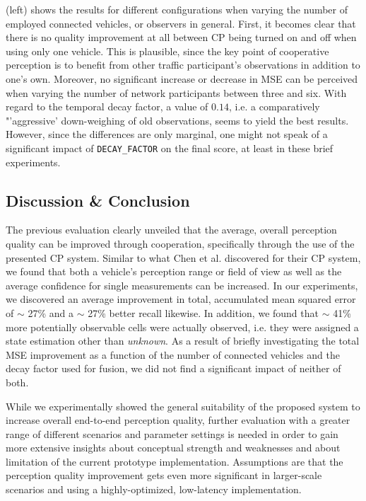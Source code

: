  (left) shows the results for different configurations when varying the number of employed connected vehicles, or observers in general. First, it becomes clear that there is no quality improvement at all between CP being turned on and off when using only one vehicle. This is plausible, since the key point of cooperative perception is to benefit from other traffic participant's observations in addition to one's own. Moreover, no significant increase or decrease in MSE can be perceived when varying the number of network participants between three and six. With regard to the temporal decay factor, a value of $0.14$, i.e. a comparatively "'aggressive' down-weighing of old observations, seems to yield the best results. However, since the differences are only marginal, one might not speak of a significant impact of \texttt{DECAY\_FACTOR} on the final score, at least in these brief experiments.

\subsection{Discussion \& Conclusion}
\label{subsec:evaluation:perception_evaluation:discussion_conclusion}
The previous evaluation clearly unveiled that the average, overall perception quality can be improved through cooperation, specifically through the use of the presented CP system. Similar to what Chen et al. \cite{Chen2019} discovered for their CP system, we found that both a vehicle's perception range or field of view as well as the average confidence for single measurements can be increased. In our experiments, we discovered an average improvement in total, accumulated mean squared error of $\sim$ 27\% and a $\sim$ 27\% better recall likewise. In addition, we found that $\sim$ 41\% more potentially observable cells were actually observed, i.e. they were assigned a state estimation other than \textit{unknown}. As a result of briefly investigating the total MSE improvement as a function of the number of connected vehicles and the decay factor used for fusion, we did not find a significant impact of neither of both.

While we experimentally showed the general suitability of the proposed system to increase overall end-to-end perception quality, further evaluation with a greater range of different scenarios and parameter settings is needed in order to gain more extensive insights about conceptual strength and weaknesses and about limitation of the current prototype implementation. Assumptions are that the perception quality improvement gets even more significant in larger-scale scenarios and using a highly-optimized, low-latency implementation.

